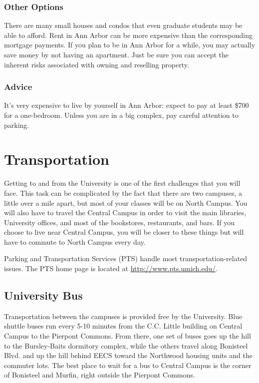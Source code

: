 \documentclass[11pt]{article}
\begin{document}
\subsubsection{Other Options}
\label{sec-10_1_5}

There are many small houses and condos that even graduate students may
be able to afford.  Rent in Ann Arbor can be more expensive than the
corresponding mortgage payments.  If you plan to be in Ann Arbor for a
while, you may actually save money by not having an apartment.  Just
be sure you can accept the inherent risks associated with owning and
reselling property.
\subsubsection{Advice}
\label{sec-10_1_6}

It's very expensive to live by yourself in Ann Arbor: expect to pay at
least \$700 for a one-bedroom.  Unless you are in a big complex, pay
careful attention to parking.
\section{Transportation}
\label{sec-11}

Getting to and from the University is one of the first challenges that
you will face.  This task can be complicated by the fact that there
are two campuses, a little over a mile apart, but most of your classes
will be on North Campus.  You will also have to travel the Central
Campus in order to visit the main libraries, University offices, and
most of the bookstores, restaurants, and bars.  If you choose to live
near Central Campus, you will be closer to these things but will have
to commute to North Campus every day.

Parking and Transportation Services (PTS) handle most
transportation-related issues.  The PTS home page is located at
\href{http://www.pts.umich.edu/}{http://www.pts.umich.edu/}.
\subsection{University Bus}
\label{sec-11_1}

Transportation between the campuses is provided free by the
University.  Blue shuttle buses run every 5-10 minutes from the
C.C. Little building on Central Campus to the Pierpont Commons.  From
there, one set of buses goes up the hill to the Bursley-Baits
dormitory complex, while the others travel along Bonisteel Blvd. and
up the hill behind EECS toward the Northwood housing units and the
commuter lots.  The best place to wait for a bus to Central Campus is
the corner of Bonisteel and Murfin, right outside the Pierpont
Commons.
\end{document}
